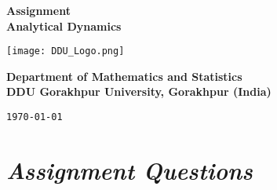 \documentclass[12pt, a4paper]{article} %
\begin{document}
\begin{titlepage}
    \begin{center}
        \vspace*{1cm}

        \Large{\bf Assignment}\\ 
        \Large{\textbf{Analytical Dynamics}}
        

        \vspace*{1cm}

        \texttt{[image: DDU\_Logo.png]}
        \vspace*{1cm}

        \begin{center}
            {\bf Department of Mathematics and Statistics\\
        DDU Gorakhpur University, Gorakhpur (India)}
        \end{center}
        
        \vfill %

        {\tt \today}\\
    \end{center}
\end{titlepage}

\BgThispage
\tableofcontents
\thispagestyle{empty}
\clearpage

\setcounter{page}{1}


\BgThispage
\section{\slshape Assignment Questions}
\end{document}
